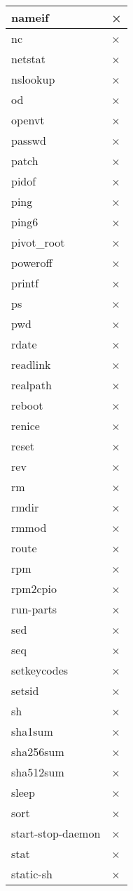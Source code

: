 \begin{longtable}{lp{50mm}}
nameif & × \\ \hline
nc & × \\ \hline
netstat & × \\ \hline
nslookup & × \\ \hline
od & × \\ \hline
openvt & × \\ \hline
passwd & × \\ \hline
patch & × \\ \hline
pidof & × \\ \hline
ping & × \\ \hline
ping6 & × \\ \hline
pivot_root & × \\ \hline
poweroff & × \\ \hline
printf & × \\ \hline
ps & × \\ \hline
pwd & × \\ \hline
rdate & × \\ \hline
readlink & × \\ \hline
realpath & × \\ \hline
reboot & × \\ \hline
renice & × \\ \hline
reset & × \\ \hline
rev & × \\ \hline
rm & × \\ \hline
rmdir & × \\ \hline
rmmod & × \\ \hline
route & × \\ \hline
rpm & × \\ \hline
rpm2cpio & × \\ \hline
run-parts & × \\ \hline
sed & × \\ \hline
seq & × \\ \hline
setkeycodes & × \\ \hline
setsid & × \\ \hline
sh & × \\ \hline
sha1sum & × \\ \hline
sha256sum & × \\ \hline
sha512sum & × \\ \hline
sleep & × \\ \hline
sort & × \\ \hline
start-stop-daemon & × \\ \hline
stat & × \\ \hline
static-sh & × \\ \hline

\end{longtable}
